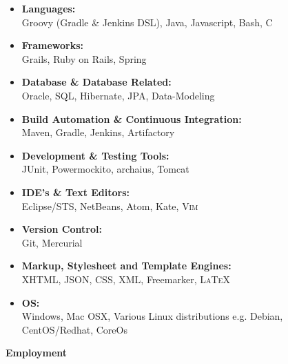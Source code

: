 \documentclass[a4paper,12pt,final,sans]{memoir}
\begin{document}
\begin{itemize}[-]
	\item	{\textbf{\color{module} Languages:} \\[-0.2em]
	Groovy (Gradle \& Jenkins DSL), Java, Javascript, Bash, \textsc{C} }
	 
	\item	{\textbf{\color{module} Frameworks:} \\[-0.2em]
	Grails, Ruby on Rails, Spring}
	
	\item	{\textbf{\color{module} Database \& Database Related:} \\[-0.2em]
	Oracle, \textsc{SQL}, Hibernate, JPA, Data-Modeling}
	
	\item	{\textbf{\color{module} Build Automation \& Continuous Integration:} \\[-0.2em]
	Maven, Gradle, Jenkins, Artifactory}
	
	\item	{\textbf{\color{module} Development \& Testing Tools:} \\[-0.2em]
	JUnit, Powermockito, archaius, Tomcat}
	
	\item	{\textbf{\color{module} IDE's \& Text Editors:} \\[-0.2em]
	Eclipse/\textsc{STS}, NetBeans, Atom, Kate, \textsc{Vim}}
	
	\item	{\textbf{\color{module} Version Control:} \\[-0.2em]
	Git, Mercurial}
	
	\item	{\textbf{\color{module} Markup, Stylesheet and Template Engines:} \\[-0.2em]
	\textsc{XHTML}, \textsc{JSON}, \textsc{CSS}, \textsc{XML}, Freemarker, {\textsc{LaTeX}}}
	
	\item	{\textbf{\color{module} \textsc{OS}:} \\[-0.2em]
	Windows, Mac OSX, Various Linux distributions e.g. Debian, CentOS/Redhat, CoreOs}
\end{itemize}

\vskip1mm

\textbf{\textsf{\color{head} \large{Employment}}} \\[-0.8em]
\end{document}
